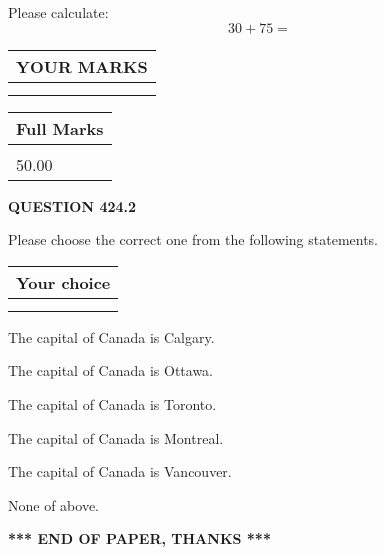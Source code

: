 \documentclass[12pt]{article}
\begin{document}
  
 
Please calculate:
\begin{equation}
30 +  %
75 = \nonumber
\end{equation}
 

 

 
  
\vspace{0.2in}
  
\noindent\begin{tabular}{|l|}
\hline
 YOUR MARKS  \\
\hline
 \\ 
 \\ 
\hline
\end{tabular}
\hspace{0.05in} \begin{tabular}{|l|}
\hline
 Full Marks  \\
\hline
 \\ 
50.00 \\
\hline
\end{tabular}
{\textbf{\Large{QUESTION
424.2 
}}}
  
  
Please choose the correct one from the following statements.
  
  
\noindent\hspace{3.0in} \begin{tabular}{|l|}
\hline
Your choice \\
\hline
 \\ 
 \\ 
\hline
\end{tabular}
  
  
 
 
The capital of Canada is Calgary.
 
 
The capital of Canada is Ottawa.
 
 
The capital of Canada is Toronto.
 
 
The capital of Canada is Montreal.
 
 
The capital of Canada is Vancouver.
 
 
 None of above.
 
 
   
   
 \vspace{0.2in}
 
   
   
   
   
\vspace{1.0in} 
{\textbf{\large{ *** END OF PAPER, THANKS *** }}} 
   
\end{document}
